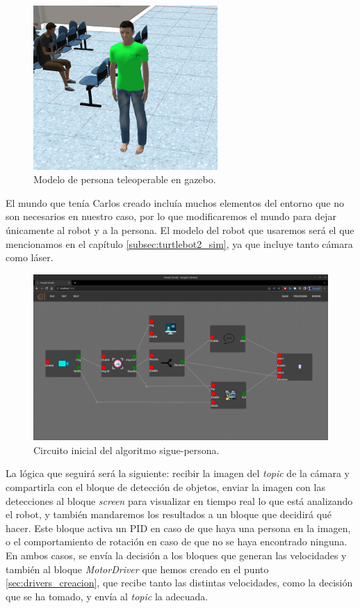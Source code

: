 \begin{figure} [H]
    \begin{center}
        \includegraphics[width=7cm]{figs/c5/elman.png}
    \end{center}
    \caption[Modelo de persona en gazebo]{Modelo de persona teleoperable en gazebo.}
    \label{fig:teleop_person}
\end{figure}
El mundo que tenía Carlos creado incluía muchos elementos del entorno que no son necesarios en nuestro caso, por lo que modificaremos el
mundo para dejar únicamente al robot y a la persona. El modelo del robot que usaremos será el que mencionamos en el capítulo \ref{subsec:turtlebot2_sim},
ya que incluye tanto cámara como láser.\\

\begin{figure} [H]
    \begin{center}
        \includegraphics[width=12cm]{figs/c5/follow_person_initial.png}
    \end{center}
    \caption[Circuito sigue-personas inicial]{Circuito inicial del algoritmo sigue-persona.}
    \label{fig:initial_follow_person}
\end{figure}

La lógica que seguirá será la siguiente: recibir la imagen del \textit{topic} de la cámara y compartirla con el bloque de detección de objetos,
enviar la imagen con las detecciones al bloque \textit{screen} para visualizar en tiempo real lo que está analizando el robot,
y también mandaremos los resultados a un bloque que decidirá qué hacer. Este bloque activa un PID en caso de que haya una persona en la imagen,
o el comportamiento de rotación en caso de que no se haya encontrado ninguna.
En ambos casos, se envía la decisión a los bloques que generan las velocidades y también al bloque \textit{MotorDriver} que hemos creado en
el punto \ref{sec:drivers_creacion}, que recibe tanto las distintas velocidades, como la decisión que se ha tomado, y envía al \textit{topic} la adecuada.

